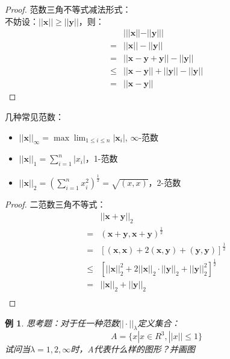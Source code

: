\documentclass[a4paper]{article}
\newtheorem{example}{例}[section]
\begin{document}
\begin{proof}
范数三角不等式减法形式：\\
不妨设：$||\mathbf{x}|| \ge ||\mathbf{y}||$，则：
\begin{equation*}
\begin{split}
& |||\mathbf{x}||-||\mathbf{y}||| \\
=& ||\mathbf{x}|| - ||\mathbf{y}|| \\
=& ||\mathbf{x} - \mathbf{y} + \mathbf{y}|| - ||\mathbf{y}|| \\
\le& ||\mathbf{x} - \mathbf{y}|| + ||\mathbf{y}|| - ||\mathbf{y}|| \\
=& ||\mathbf{x} - \mathbf{y}||
\end{split}
\end{equation*}
\end{proof}


几种常见范数：
\begin{itemize}
\item $||\mathbf{x}||_\infty = \max \lim_{1\le i \le n}|\mathbf{x}_i|$, $\infty$-范数
\item $||\mathbf{x}||_1=\sum^{n}_{i=1}|x_i|$，1-范数
\item $||\mathbf{x}||_2=(\sum^n_{i=1}x_i^2)^\frac{1}{2}=\sqrt{(x,x)}$，2-范数
\end{itemize}


\begin{proof}
二范数三角不等式：\\
\begin{equation*}
\begin{split}
&||\mathbf{x}+\mathbf{y}||_2 \\
=& (\mathbf{x}+\mathbf{y}, \mathbf{x}+\mathbf{y})^{\frac{1}{2}} \\
=&[(\mathbf{x},\mathbf{x}) + 2(\mathbf{x}, \mathbf{y}) + (\mathbf{y}, \mathbf{y})]^{\frac{1}{2}} \\
\le& [||\mathbf{x}||^2_2 + 2||\mathbf{x}||_2\cdot||\mathbf{y}||_2 + ||\mathbf{y}||_2^2]^{\frac{1}{2}} \\
=& ||\mathbf{x}||_2+||\mathbf{y}||_2\\
\end{split}
\end{equation*}
\end{proof}

\begin{example}
思考题：对于任一种范数$||\cdot||_\lambda$定义集合：
$$A=\{x|x\in R^3, ||x|| \le 1\}$$
试问当$\lambda=1,2,\infty$时，A代表什么样的图形？并画图
\end{example}
\end{document}
